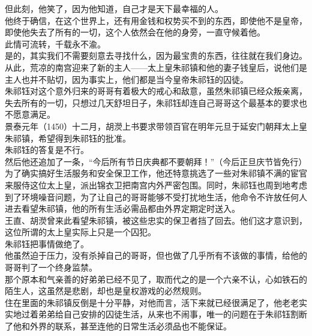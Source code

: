 \begin{multicols}{\theparacolNo}
但此刻，他笑了，因为他知道，自己才是天下最幸福的人。\\

他终于确信，在这个世界上，还有用金钱和权势买不到的东西，即使他不是皇帝，即使他失去了所有的一切，这个人依然会在他的身旁，一直守候着他。\\

此情可流转，千载永不渝。\\

是的，其实我们不需要刻意去寻找什么，因为最宝贵的东西，往往就在我们身边。\\

从此，荒凉的南宫迎来了新的主人——太上皇朱祁镇和他的妻子钱皇后，说他们是主人也并不贴切，因为事实上，他们都是当今皇帝朱祁钰的囚徒。\\

朱祁钰对这个意外归来的哥哥有着极大的戒心和敌意，虽然朱祁镇已经众叛亲离，失去所有的一切，只想过几天舒坦日子，朱祁钰却连自己哥哥这个最基本的要求也不愿意满足。\\

景泰元年（1450）十二月，胡濙上书要求带领百官在明年元旦于延安门朝拜太上皇朱祁镇，希望得到朱祁钰的批准。\\

朱祁钰的答复是不行。\\

然后他还追加了一条，“今后所有节日庆典都不要朝拜！”（今后正旦庆节皆免行）\\

为了确实搞好生活服务和安全保卫工作，他还特意挑选了一些对朱祁镇不满的宦官来服侍这位太上皇，派出锦衣卫把南宫内外严密包围。同时，朱祁钰也周到地考虑到了环境噪音问题，为了让自己的哥哥能够不受打扰地生活，他命令不许放任何人进去看望朱祁镇，他的所有生活必需品都由外界定期定时送入。\\

王直、胡濙曾来此看望朱祁镇，被这些忠实的保卫者挡了回去。他们这才意识到，这位所谓的太上皇实际上只是一个囚犯。\\

朱祁钰把事情做绝了。\\

他虽然迫于压力，没有杀掉自己的哥哥，但也做了几乎所有不该做的事情，给他的哥哥判了一个终身监禁。\\

那个原本和气亲善的好弟弟已经不见了，取而代之的是一个六亲不认，心如铁石的陌生人，这虽然是悲剧，却也是皇权游戏的必然规则。\\

住在里面的朱祁镇反倒是十分平静，对他而言，活下来就已经很满足了，他老老实实地过着弟弟给自己安排的囚徒生活，从来也不闹事，唯一的问题在于朱祁钰割断了他和外界的联系，甚至连他的日常生活必须品也不能保证。\\


\end{multicols}
